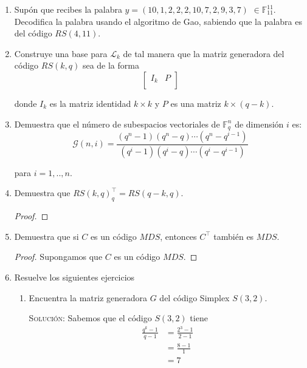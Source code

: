\documentclass[letterpaper,10pt]{article}
\begin{document}
\begin{enumerate}
    \item Supón que recibes la palabra $y = (10, 1, 2, 2, 2, 10, 7, 2, 9, 3, 7)$
    $\in \mathbb{F}^{11}_{11}$. Decodifica la palabra usando el algoritmo de
    Gao, sabiendo que la palabra es del código $RS(4,11)$.
    
    \item Construye una base para $\mathcal{L}_{k}$ de tal manera que la matriz
    generadora del código $RS(k, q)$ sea de la forma 
    \begin{equation}
    \begin{bmatrix}
    I_{k} & P\\
    \end{bmatrix}
    \end{equation}
    
    donde $I_{k}$ es la matriz identidad $k \times k$ y $P$ es una matriz 
    $k \times (q-k)$. 
    
    \item Demuestra que el número de subespacios vectoriales de 
    $\mathbb{F}^{n}_{q}$ de dimensión $i$ es: 
    \begin{equation}
        \mathcal{G}(n, i) = \frac{(q^{n}-1)(q^{n}-q)\cdots(q^{n}-q^{i-1})}
        {(q^{i}-1)(q^{i}-q)\cdots(q^{i}-q^{i-1})}
    \end{equation}
    
    para $i = 1,.., n$.
    
    \item Demuestra que $RS(k, q)^{\top}_{q} = RS(q-k, q)$.
    \begin{proof}
        
    \end{proof}

    
    \item Demuestra que si $C$ es un código $MDS$, entonces $C^{\top}$ también
    es $MDS$. 
    \begin{proof}
        Supongamos que $C$ es un código $MDS$.
    \end{proof}

    \item Resuelve los siguientes ejercicios
    \begin{enumerate}
        \item Encuentra la matriz generadora $G$ del código Simplex $S(3,2)$.
        
        \textsc{Solución:} Sabemos que el código $S(3,2)$ tiene 
        \begin{align*}
            \frac{q^{k}-1}{q-1} 
            &= \frac{2^{3}-1}{2-1} \\
            &= \frac{8-1}{1} \\
            &= 7
        \end{align*}
        

\end{enumerate}
\end{enumerate}
\end{document}
